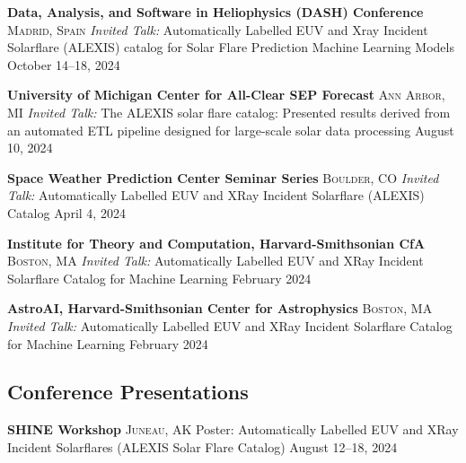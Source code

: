 \documentclass[11pt,a4paper]{article}
\begin{document}
\headedsection
{\textbf{Data, Analysis, and Software in Heliophysics (DASH) Conference}}
{\textsc{Madrid, Spain}}
{%
    \headedsubsection
    {\textit{Invited Talk:} Automatically Labelled EUV and Xray Incident Solarflare (ALEXIS) catalog for Solar Flare Prediction Machine Learning Models}
    {October 14–18, 2024}
    {}
}

\headedsection
{\textbf{University of Michigan Center for All-Clear SEP Forecast}}
{\textsc{Ann Arbor, MI}}
{%
    \headedsubsection
    {\textit{Invited Talk:} The ALEXIS solar flare catalog: Presented results derived from an automated ETL pipeline designed for large-scale solar data processing}
    {August 10, 2024}
    {}
}

\headedsection
{\textbf{Space Weather Prediction Center Seminar Series}}
{\textsc{Boulder, CO}}
{%
    \headedsubsection
    {\textit{Invited Talk:} Automatically Labelled EUV and XRay Incident Solarflare (ALEXIS) Catalog}
    {April 4, 2024}
    {}
}

\headedsection
{\textbf{Institute for Theory and Computation, Harvard-Smithsonian CfA}}
{\textsc{Boston, MA}}
{%
    \headedsubsection
    {\textit{Invited Talk:} Automatically Labelled EUV and XRay Incident Solarflare Catalog for Machine Learning}
    {February 2024}
    {}
}

\headedsection
{\textbf{AstroAI, Harvard-Smithsonian Center for Astrophysics}}
{\textsc{Boston, MA}}
{%
    \headedsubsection
    {\textit{Invited Talk:} Automatically Labelled EUV and XRay Incident Solarflare Catalog for Machine Learning}
    {February 2024}
    {}
}

\subsection*{Conference Presentations}

\headedsection
{\textbf{SHINE Workshop}}
{\textsc{Juneau, AK}}
{%
    \headedsubsection
    {Poster: Automatically Labelled EUV and XRay Incident Solarflares (ALEXIS Solar Flare Catalog)}
    {August 12–18, 2024}
    {}
}
\end{document}
